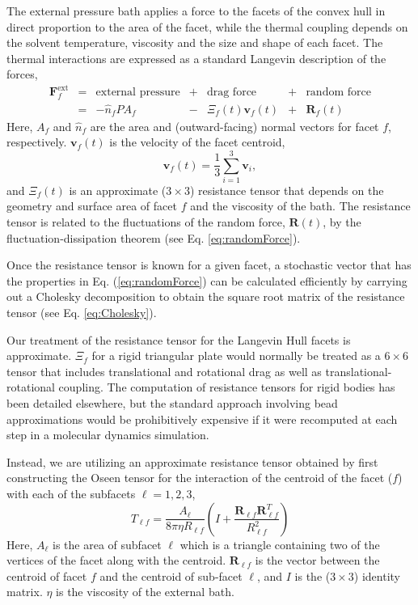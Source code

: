 \documentclass[letterpaper]{report}
\begin{document}
The external pressure bath applies a force to the facets of the convex
hull in direct proportion to the area of the facet, while the thermal
coupling depends on the solvent temperature, viscosity and the size
and shape of each facet. The thermal interactions are expressed as a
standard Langevin description of the forces,
\begin{equation}
\begin{array}{rclclcl}
{\mathbf F}_f^{\text{ext}} & = &  \text{external pressure} & + & \text{drag force} & + & \text{random force} \\
& = &  -\hat{n}_f P A_f  & - & \Xi_f(t) {\mathbf v}_f(t)  & + & {\mathbf R}_f(t)
\end{array}
\end{equation}
Here, $A_f$ and $\hat{n}_f$ are the area and (outward-facing) normal
vectors for facet $f$, respectively.  ${\mathbf v}_f(t)$ is the
velocity of the facet centroid,
\begin{equation}
{\mathbf v}_f(t) =  \frac{1}{3} \sum_{i=1}^{3} {\mathbf v}_i,
\end{equation}
and $\Xi_f(t)$ is an approximate ($3 \times 3$) resistance tensor that
depends on the geometry and surface area of facet $f$ and the
viscosity of the bath.  The resistance tensor is related to the
fluctuations of the random force, $\mathbf{R}(t)$, by the
fluctuation-dissipation theorem (see Eq. \ref{eq:randomForce}).

Once the resistance tensor is known for a given facet, a stochastic
vector that has the properties in Eq. (\ref{eq:randomForce}) can be
calculated efficiently by carrying out a Cholesky decomposition to
obtain the square root matrix of the resistance tensor (see
Eq. \ref{eq:Cholesky}).

Our treatment of the resistance tensor for the Langevin Hull facets is
approximate.  $\Xi_f$ for a rigid triangular plate would normally be
treated as a $6 \times 6$ tensor that includes translational and
rotational drag as well as translational-rotational coupling. The
computation of resistance tensors for rigid bodies has been detailed
elsewhere,\cite{JoseGarciadelaTorre02012000,Garcia-de-la-Torre:2001wd,GarciadelaTorreJ2002,Sun:2008fk}
but the standard approach involving bead approximations would be
prohibitively expensive if it were recomputed at each step in a
molecular dynamics simulation.

Instead, we are utilizing an approximate resistance tensor obtained by
first constructing the Oseen tensor for the interaction of the
centroid of the facet ($f$) with each of the subfacets $\ell=1,2,3$,
\begin{equation}
T_{\ell f}=\frac{A_\ell}{8\pi\eta R_{\ell f}}\left(I +
  \frac{\mathbf{R}_{\ell f}\mathbf{R}_{\ell f}^T}{R_{\ell f}^2}\right)
\end{equation}
Here, $A_\ell$ is the area of subfacet $\ell$ which is a triangle
containing two of the vertices of the facet along with the centroid.
$\mathbf{R}_{\ell f}$ is the vector between the centroid of facet $f$
and the centroid of sub-facet $\ell$, and $I$ is the ($3 \times 3$)
identity matrix.  $\eta$ is the viscosity of the external bath.
\end{document}
